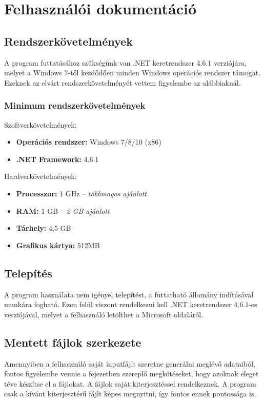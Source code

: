 
\chapter{Felhasználói dokumentáció}
	\section{Rendszerkövetelmények}
		A program futtatásához szükségünk van .NET keretrendszer 4.6.1 verziójára, melyet a Windows 7-től kezdődően minden Windows operációs rendszer támogat. Ezeknek az elvárt rendszerkövetelményét vettem figyelembe az alábbiaknál. \cite{dotnet} \cite{win}
		\subsection{Minimum rendszerkövetelmények}
		Szoftverkövetelmények:
		\begin{itemize}
			\item \textbf{Operációs rendszer:} Windows 7/8/10 (x86)
			\item \textbf{.NET Framework:} 4.6.1
		\end{itemize}
		
		Hardverkövetelmények:
		\begin{itemize}
			\item \textbf{Processzor:} 1 GHz -- \textit{többmagos ajánlott}
			\item \textbf{RAM:} 1 GB -- \textit{2 GB ajánlott}
			\item \textbf{Tárhely:} 4,5 GB
			\item \textbf{Grafikus kártya:} 512MB 
		\end{itemize}
	 
	\section{Telepítés}
	
		A program használata nem igényel telepítést, a futtatható állomány indításával munkára fogható. Ezen felül viszont rendelkezni kell .NET keretrendszer $4.6.1$-es verziójával, melyet a felhasználó letölthet a Microsoft oldaláról.
		
	\section{Mentett fájlok szerkezete}
		
		Amennyiben a felhasználó saját inputfájlt szeretne generálni meglévő adataiból, fontos figyelembe vennie a fejezetben szereplő megkötéseket, hogy azoknak eleget téve készítse el a fájlokat. A fájlok saját kiterjesztéssel rendelkeznek. A program csak a kívánt kiterjesztésű fájlt képes megnyitni, így fontos ennek pontossága is. 
		
